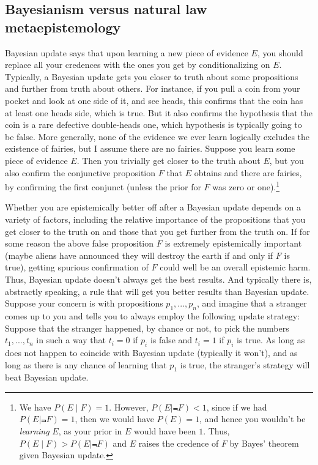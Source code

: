\subsection{Bayesianism versus natural law metaepistemology}
Bayesian update says that upon learning a new piece of evidence $E$, you should replace all your credences with the 
ones you get by conditionalizing on $E$. Typically, a Bayesian update gets you closer to truth about some 
propositions and further from truth about others. For instance, if you pull a coin from your pocket and look at one
side of it, and see heads, this confirms that the coin has at least one heads side, which is true. But it also 
confirms the hypothesis that the coin is a rare defective double-heads one, which hypothesis is typically going to 
be false. More generally, none of the evidence we ever learn logically excludes the existence of fairies, but I 
assume there are no fairies. Suppose you learn some piece of evidence $E$. Then you trivially get closer to the truth
about $E$, but you also confirm the conjunctive proposition $F$ that $E$ obtains and there are fairies, by confirming the 
first conjunct (unless the prior for $F$ was zero or one).\footnote{We have $P(E\mid F)=1$. However, $P(E\mid \Not F)<1$,
since if we had $P(E\mid \Not F)=1$, then we would have $P(E)=1$, and hence you wouldn't be \textit{learning} $E$, as your
prior in $E$ would have been $1$. Thus, $P(E\mid F)>P(E\mid\Not F)$ and $E$ raises the credence of $F$ by Bayes' theorem
given Bayesian update.} 

Whether you are epistemically better off after a Bayesian update depends on a variety of factors, including the relative 
importance of the propositions that you get closer to the truth on and those that you get further from the truth on. 
If for some reason the above false proposition $F$ is extremely epistemically important (maybe aliens have announced they will 
destroy the earth if and only if $F$ is true), getting spurious confirmation of $F$ could well be an overall epistemic harm. 
Thus, Bayesian update doesn't always get the best results. And typically there is, abstractly speaking, 
a rule that will get you better results than Bayesian update. Suppose your concern is with propositions $p_1,...,p_n$, and 
imagine that a stranger comes up to you and tells you to always employ the following update strategy:
Suppose that the stranger happened, by chance or not, to pick the numbers $t_1,...,t_n$ in such a way that $t_i=0$ if 
$p_i$ is false and $t_i=1$ if $p_i$ is true. As long as  does not happen to coincide with Bayesian 
update (typically it won't), and as long as there is any chance of learning that $p_1$ is true, the stranger's strategy 
will beat Bayesian update. 

